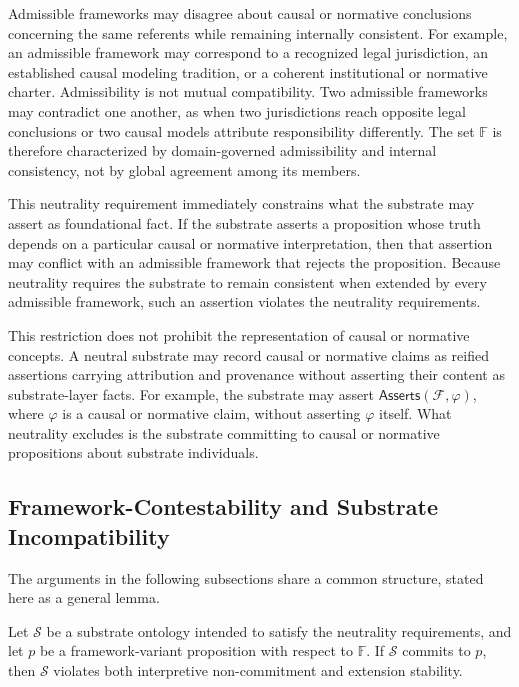Admissible frameworks may disagree about
causal or normative conclusions concerning the same referents
while remaining internally consistent.
For example, an admissible framework may correspond to
a recognized legal jurisdiction, an established causal modeling tradition,
or a coherent institutional or normative charter.
Admissibility is not mutual compatibility.
Two admissible frameworks may contradict one another,
as when two jurisdictions reach opposite legal conclusions
or two causal models attribute responsibility differently.
The set $\mathbb{F}$ is therefore characterized by domain-governed
admissibility and internal consistency,
not by global agreement among its members.

This neutrality requirement immediately constrains
what the substrate may assert as foundational fact.
If the substrate asserts a proposition whose truth depends
on a particular causal or normative interpretation,
then that assertion may conflict with an admissible framework
that rejects the proposition.
Because neutrality requires the substrate to remain consistent
when extended by every admissible framework,
such an assertion violates the neutrality requirements.

This restriction does not prohibit the representation of
causal or normative concepts.
A neutral substrate may record
causal or normative claims as reified assertions
carrying attribution and provenance
without asserting their content as substrate-layer facts.
For example, the substrate may assert
$\mathsf{Asserts}(\mathcal{F}, \varphi)$,
where $\varphi$ is a causal or normative claim,
without asserting $\varphi$ itself.
What neutrality excludes is the substrate committing to
causal or normative propositions about substrate individuals.

\subsection{Framework-Contestability and Substrate Incompatibility}
\label{subsec:general-lemma}

The arguments in the following subsections share a common structure,
stated here as a general lemma.

\begin{lemma}
  \label{lem:contestability}
  Let $\mathcal{S}$ be a substrate ontology intended to satisfy the neutrality requirements,
  and let $p$ be a framework-variant proposition
  with respect to $\mathbb{F}$.
  If $\mathcal{S}$ commits to $p$,
  then $\mathcal{S}$ violates both interpretive non-commitment
  and extension stability.
\end{lemma}

